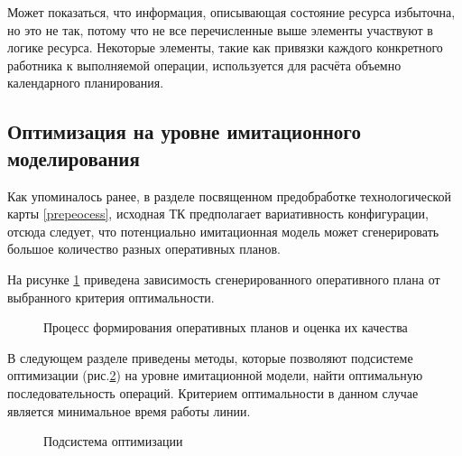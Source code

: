 Может показаться, что информация, описывающая состояние ресурса избыточна, но это не так, потому что не все перечисленные выше элементы участвуют в логике ресурса. Некоторые элементы, такие как привязки каждого конкретного работника к выполняемой операции, используется для расчёта объемно календарного планирования.


\subsection{Оптимизация на уровне имитационного моделирования}

Как упоминалось ранее, в разделе посвященном предобработке технологической карты \ref{prepeocess}, исходная ТК предполагает вариативность конфигурации, отсюда следует, что потенциально имитационная модель может сгенерировать большое количество разных оперативных планов.

На рисунке \ref{ris:IM_process} приведена зависимость сгенерированного оперативного плана от выбранного критерия оптимальности.


\begin{figure}[H]
    \caption{Процесс формирования оперативных планов и оценка их качества}
    \label{ris:IM_process}
\end{figure}

В следующем разделе приведены методы, которые позволяют подсистеме оптимизации (рис.\ref{ris:optimization}) на уровне имитационной модели, найти оптимальную последовательность операций. Критерием оптимальности в данном случае является минимальное время работы линии.

\begin{figure}[H]
    \caption{Подсистема оптимизации}
    \label{ris:optimization}
\end{figure}


